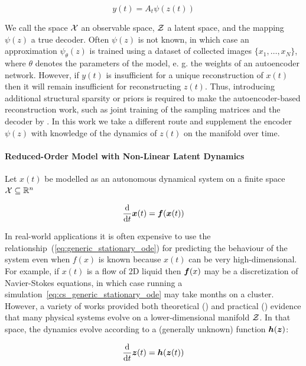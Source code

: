 \begin{equation}
    \label{eq:cs_with_ae}
    y(t) = A_t\psi(z(t))
\end{equation}


 We call the space $\operatorname{\mathcal{X}}$ an observable space, $\operatorname{\mathcal{Z}}$ a latent space, and the mapping $\psi(z)$ a true decoder. Often $\psi(z)$ is not known, in which case an approximation $\psi_\theta(z)$ is trained using a dataset of collected images $\{x_1, \dots, x_N\}$, where $\theta$ denotes the parameters of the model, e. g. the weights of an autoencoder network. However, if $y(t)$ is insufficient for a unique reconstruction of $x(t)$ then it will remain insufficient for reconstructing $z(t)$. Thus, introducing additional structural sparsity or priors is required to make the autoencoder-based reconstruction work, such as joint training of the sampling matrices and the decoder by \citep{wang2022single}. In this work we take a different route and supplement the encoder $\psi(z)$ with knowledge of the dynamics of $z(t)$ on the manifold over time. 

\paragraph{Reduced-Order Model with Non-Linear Latent Dynamics}
Let $x(t)$ be modelled as an autonomous dynamical system on a finite space $\operatorname{\mathcal{X}} \subseteq \mathbb{R}^n$

\begin{equation}
    \label{eq:cs_generic_stationary_ode}
        \frac{\mathrm{d}}{\mathrm{d}t}\boldsymbol{x}(t) = \boldsymbol{f}(\boldsymbol{x}(t))
\end{equation}

In real-world applications it is often expensive to use the relationship~(\ref{eq:generic_stationary_ode}) for predicting the behaviour of the system even when $f(x)$ is known because $x(t)$ can be very high-dimensional. For example, if $x(t)$ is a flow of 2D liquid then $\boldsymbol{f}(x)$ may be a discretization of Navier-Stokes equations, in which case running a simulation~\ref{eq:cs_generic_stationary_ode} may take months on a cluster. However, a variety of works provided both theoretical (\citep{holmes2012turbulence}) and practical (\citep{noack2011reduced,chen2021discovering}) evidence that many physical systems evolve on a lower-dimensional manifold $\operatorname{\mathcal{Z}}$. In that space, the dynamics evolve according to a (generally unknown) function  $\boldsymbol{h}(\boldsymbol{z})$:

\begin{equation}
        \frac{\mathrm{d}}{\mathrm{d}t}\boldsymbol{z}(t) = \boldsymbol{h}(\boldsymbol{z}(t))
\end{equation}

